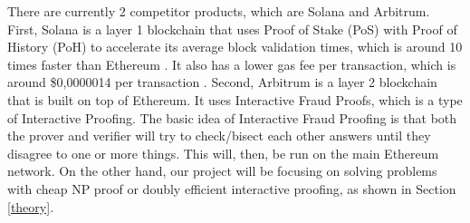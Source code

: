 There are currently 2 competitor products, which are Solana and Arbitrum. First, Solana is a layer 1 blockchain that uses Proof of Stake (PoS) with Proof of History (PoH) to accelerate its average block validation times, which is around 10 times faster than Ethereum \cite{tyson_2022}. It also has a lower gas fee per transaction, which is around \$0,0000014 per transaction \cite{beincrypto_2022}. Second, Arbitrum is a layer 2 blockchain that is built on top of Ethereum. It uses Interactive Fraud Proofs, which is a type of Interactive Proofing. The basic idea of Interactive Fraud Proofing is that both the prover and verifier will try to check/bisect each other answers until they disagree to one or more things. This will, then, be run on the main Ethereum network. On the other hand, our project will be focusing on solving problems with cheap NP proof or doubly efficient interactive proofing, as shown in Section \ref{theory}.